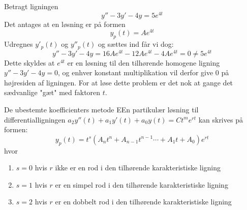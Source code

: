 \begin{Example}\hfill \break
\textnormal{Betragt ligningen} $$y'' -3y'-4y=5e^{4t}$$ \textnormal{Det antages at en løsning er på formen} $$y_p(t)=Ae^{4t}$$ \textnormal{Udregnes $y'_p(t)$ og $y''_p(t)$ og sættes ind får vi dog:}
$$y'' -3y'-4y=16Ae^{4t}-12Ae^{4t}-4Ae^{4t}=0  \neq 5e^{4t}$$
\textnormal{Dette skyldes at $e^{4t}$ er en løsning til den tilhørende homogene ligning $y'' -3y'-4y=0$, og enhver konstant multiplikation vil derfor give 0 på højresiden af ligningen. For at løse dette problem er det nok at gange det sædvanlige "gæt" med faktoren $t$.}
\end{Example}

\hfill \break
\begin{prop}{De ubestemte koefficienters metode}
EEn partikulær løsning til differentialligningen $a_2y''(t)+a_1y'(t)+a_0y(t)=Ct^me^{rt}$ kan skrives på formen: 
$$y_p(t)= t^s(A_nt^n+A_{n-1}t^{n-1}  \cdots +A_1t+A_0)e^{rt}$$ 
hvor 
\begin{enumerate}
    \item $s=0$ hvis $r$ ikke er en rod i den tilhørende karakteristiske ligning
    \item $s=1$ hvis $r$ er en simpel rod i den tilhørende karakteristiske ligning
    \item $s=2$ hvis $r$ er en dobbelt rod i den tilhørende karakteristiske ligning
\end{enumerate}
\end{prop}
\hfill \break

